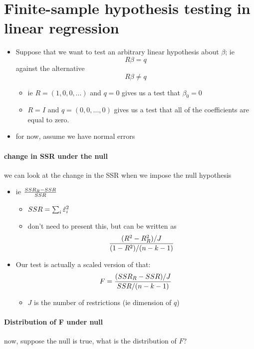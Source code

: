 \section{Finite-sample hypothesis testing in linear regression}

\begin{itemize}[leftmargin=0pt]

\item Suppose that we want to test an arbitrary linear hypothesis about
  $\beta$; ie \[R \beta = q\] against the alternative \[R \beta \neq q\]
\begin{itemize}
\item ie $R = (1, 0, 0, ...)$ and $q=0$ gives us a test that $\beta_0=0$
\item $R = I$ and $q = (0,0,...,0)$ gives us a test that all of the
         coefficients are equal to zero.
\end{itemize}
\item for now, assume we have normal errors
\end{itemize}

\paragraph{change in SSR under the null}
      we can look at the change in the SSR when we impose the null
        hypothesis
\begin{itemize}
\item ie ${SSR_R - SSR \over SSR}$
\begin{itemize}
\item $SSR = \sum_i \hat{\varepsilon}^2_i$
\item don't need to present this, but can be written as \[
  {(R^2 - R^2_R) / J \over (1-R^2) / (n-k-1)} \]
\end{itemize}
\item Our test is actually a scaled version of that:
  \[ F = {(SSR_R - SSR)/J \over SSR / (n-k-1)} \]
\begin{itemize}
\item $J$ is the number of restrictions (ie dimension of $q$)
\end{itemize}
\end{itemize}

\paragraph{Distribution of F under null}
      now, suppose the null is true, what is the distribution of $F$?

